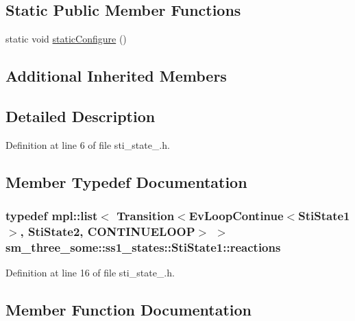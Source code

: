\subsection*{Static Public Member Functions}
\begin{DoxyCompactItemize}
\item 
static void \hyperlink{structsm__three__some_1_1ss1__states_1_1StiState1_a0e160d19f55f0dd645892f7a46cff33a}{static\+Configure} ()
\end{DoxyCompactItemize}
\subsection*{Additional Inherited Members}


\subsection{Detailed Description}


Definition at line 6 of file sti\+\_\+state\+\_.\+h.



\subsection{Member Typedef Documentation}
\subsubsection[{\texorpdfstring{reactions}{reactions}}]{\setlength{\rightskip}{0pt plus 5cm}typedef mpl\+::list$<$ Transition$<$Ev\+Loop\+Continue$<${\bf Sti\+State1}$>$, {\bf Sti\+State2}, C\+O\+N\+T\+I\+N\+U\+E\+L\+O\+OP$>$ $>$ {\bf sm\+\_\+three\+\_\+some\+::ss1\+\_\+states\+::\+Sti\+State1\+::reactions}}\hypertarget{structsm__three__some_1_1ss1__states_1_1StiState1_add54306b7f1b76be74f9dd9d8a238523}{}\label{structsm__three__some_1_1ss1__states_1_1StiState1_add54306b7f1b76be74f9dd9d8a238523}


Definition at line 16 of file sti\+\_\+state\+\_.\+h.



\subsection{Member Function Documentation}
